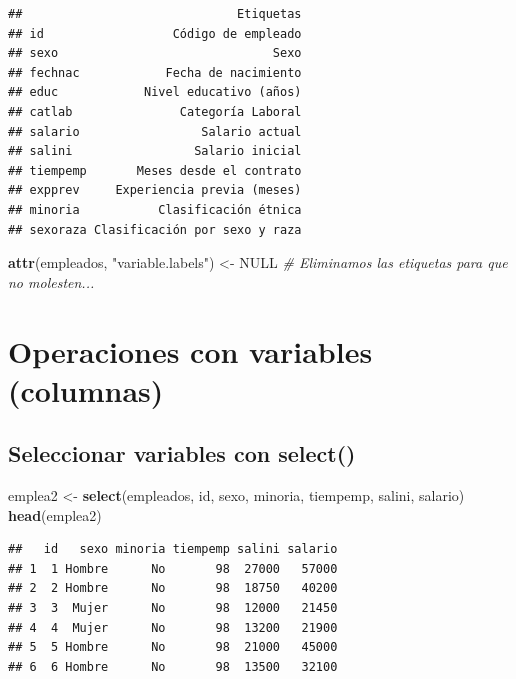 \documentclass[]{book}
\newenvironment{Shaded}{\begin{snugshade}}{\end{snugshade}}
\newcommand{\CommentTok}[1]{\textcolor[rgb]{0.56,0.35,0.01}{\textit{#1}}}
\newcommand{\KeywordTok}[1]{\textcolor[rgb]{0.13,0.29,0.53}{\textbf{#1}}}
\newcommand{\NormalTok}[1]{#1}
\newcommand{\OtherTok}[1]{\textcolor[rgb]{0.56,0.35,0.01}{#1}}
\newcommand{\StringTok}[1]{\textcolor[rgb]{0.31,0.60,0.02}{#1}}
\begin{document}
\begin{verbatim}
##                              Etiquetas
## id                  Código de empleado
## sexo                              Sexo
## fechnac            Fecha de nacimiento
## educ            Nivel educativo (años)
## catlab               Categoría Laboral
## salario                 Salario actual
## salini                 Salario inicial
## tiempemp       Meses desde el contrato
## expprev     Experiencia previa (meses)
## minoria           Clasificación étnica
## sexoraza Clasificación por sexo y raza
\end{verbatim}

\begin{Shaded}
\begin{Highlighting}[]
\KeywordTok{attr}\NormalTok{(empleados, }\StringTok{"variable.labels"}\NormalTok{) <-}\StringTok{ }\OtherTok{NULL}                  \CommentTok{# Eliminamos las etiquetas para que no molesten...}
\end{Highlighting}
\end{Shaded}

\hypertarget{operaciones-con-variables-columnas}{%
\section{Operaciones con variables (columnas)}\label{operaciones-con-variables-columnas}}

\hypertarget{seleccionar-variables-con-select}{%
\subsection{\texorpdfstring{Seleccionar variables con \textbf{select()}}{Seleccionar variables con select()}}\label{seleccionar-variables-con-select}}

\begin{Shaded}
\begin{Highlighting}[]
\NormalTok{emplea2 <-}\StringTok{ }\KeywordTok{select}\NormalTok{(empleados, id, sexo, minoria, tiempemp, salini, salario)}
\KeywordTok{head}\NormalTok{(emplea2)}
\end{Highlighting}
\end{Shaded}

\begin{verbatim}
##   id   sexo minoria tiempemp salini salario
## 1  1 Hombre      No       98  27000   57000
## 2  2 Hombre      No       98  18750   40200
## 3  3  Mujer      No       98  12000   21450
## 4  4  Mujer      No       98  13200   21900
## 5  5 Hombre      No       98  21000   45000
## 6  6 Hombre      No       98  13500   32100
\end{verbatim}
\end{document}
